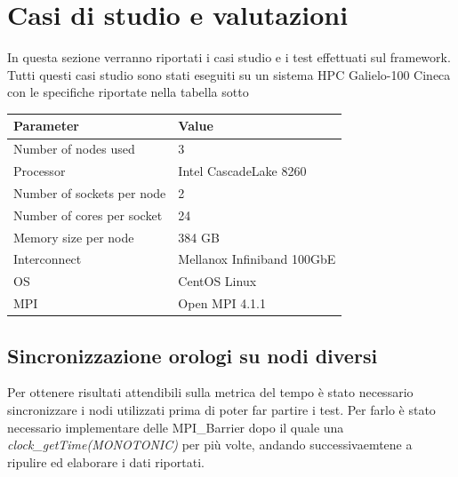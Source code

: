 \chapter{Casi di studio e valutazioni}
\noindent In questa sezione verranno riportati i casi studio e i test effettuati sul framework. Tutti questi casi studio sono stati eseguiti su un sistema HPC Galielo-100 Cineca con le specifiche riportate nella tabella sotto

\vspace{.7cm}
\begin{center}

\begin{tabular}{l|l}
    \hline
    \textbf{Parameter} & \textbf{Value} \\
    \hline
    Number of nodes used & 3 \\
    \hline
    Processor & Intel CascadeLake 8260 \\
    \hline
    Number of sockets per node & 2 \\
    \hline
    Number of cores per socket & 24 \\
    \hline
    Memory size per node & 384 GB \\
    \hline
    Interconnect & Mellanox Infiniband 100GbE \\
    \hline
    OS & CentOS Linux \\ 
    \hline
    MPI & Open MPI  4.1.1 \\
    \hline
\end{tabular}
\end{center}
\section{Sincronizzazione orologi su nodi diversi}
Per ottenere risultati attendibili sulla metrica del tempo è stato necessario sincronizzare i nodi utilizzati prima di poter far partire i test. Per farlo è stato necessario implementare delle MPI\_Barrier dopo il quale una \emph{clock\_getTime(MONOTONIC)} per più volte, andando successivaemtene a ripulire ed elaborare i dati riportati.

